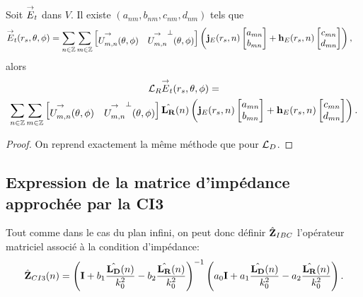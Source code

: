     \begin{prop}
      Soit \({\overset{\rightarrow}{E}}_t\) dans \(V\). Il existe \((a_{nm},b_{nm},c_{nm},d_{nm})\) tels que
      \begin{align*}
      {\overset{\rightarrow}{E}}_t(r_s,\theta,\phi) &= \sum_{n\in\mathbb Z}\sum_{m\in\mathbb Z}
            \begin{bmatrix}
              {\overset{\rightarrow}{U_{m,n}^{{}}}}(\theta,\phi) & {\overset{\rightarrow}{U_{m,n}^{{}}}}^\perp(\theta,\phi)
            \end{bmatrix}
            \left(
              \mathbf{j}_E(r_s,n)
              \begin{bmatrix}
                  a_{mn}
                  \\
                  b_{mn}
              \end{bmatrix}
              +
              \mathbf{h}_E(r_s,n)
              \begin{bmatrix}
                  c_{mn}
                  \\
                  d_{mn}
              \end{bmatrix}
            \right),
      \end{align*}
      alors
      \begin{multline*}
        {\mathcal{L}_R}{\overset{\rightarrow}{E}}_t(r_s,\theta,\phi) = 
        \\
         \sum_{n\in\mathbb Z}\sum_{m\in\mathbb Z}
            \begin{bmatrix}
              {\overset{\rightarrow}{U_{m,n}^{{}}}}(\theta,\phi) & {\overset{\rightarrow}{U_{m,n}^{{}}}}^\perp(\theta,\phi)
            \end{bmatrix}
            \hat{\mathbf{L_R}}(n)
            \left(
              \mathbf{j}_E(r_s,n)
              \begin{bmatrix}
                  a_{mn}
                  \\
                  b_{mn}
              \end{bmatrix}
              +
              \mathbf{h}_E(r_s,n)
              \begin{bmatrix}
                  c_{mn}
                  \\
                  d_{mn}
              \end{bmatrix}
            \right).
      \end{multline*}
    \end{prop}

    \begin{proof}
      On reprend exactement la même méthode que pour \({\mathcal{L}_D}\).
    \end{proof}

  \subsection{Expression de la matrice d'impédance approchée par la CI3}

    Tout comme dans le cas du plan infini, on peut donc définir \(\hat{\mathbf{Z}}_{IBC}\) l’opérateur matriciel associé à la condition d'impédance:
    \begin{align}
        \label{eq:sphere:hoibc:ci3}
        \hat{\mathbf{Z}}_{CI3}(n) = \left(\mathbf{I} + b_1 \dfrac{\hat{\mathbf{L_D}}(n)}{k_0^2} - b_2 \dfrac{\hat{\mathbf{L_R}}(n)}{k_0^2} \right)^{-1}
        \left(a_0 \mathbf{I} + a_1 \dfrac{\hat{\mathbf{L_D}}(n)}{k_0^2} - a_2 \dfrac{\hat{\mathbf{L_R}}(n)}{k_0^2}\right).
    \end{align}
